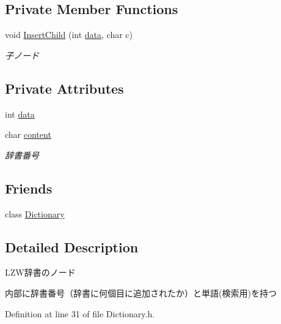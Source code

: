 \subsection*{Private Member Functions}
\begin{DoxyCompactItemize}
\item 
void \hyperlink{classprdc__lzw_1_1LzwNode_adcb9f453effcb8fac95bb08a59665eb7}{Insert\-Child} (int \hyperlink{classprdc__lzw_1_1LzwNode_ac85178681ea1181b22c3ac43af32515a}{data}, char c)
\begin{DoxyCompactList}\small\item\em 子ノード \end{DoxyCompactList}\end{DoxyCompactItemize}
\subsection*{Private Attributes}
\begin{DoxyCompactItemize}
\item 
int \hyperlink{classprdc__lzw_1_1LzwNode_ac85178681ea1181b22c3ac43af32515a}{data}
\item 
char \hyperlink{classprdc__lzw_1_1LzwNode_acb2b7cb34053125cfdf7595aba9bc172}{content}
\begin{DoxyCompactList}\small\item\em 辞書番号 \end{DoxyCompactList}\end{DoxyCompactItemize}
\subsection*{Friends}
\begin{DoxyCompactItemize}
\item 
class \hyperlink{classprdc__lzw_1_1LzwNode_a61780a02d5e0994eb40a4b79f9c007ad}{Dictionary}
\end{DoxyCompactItemize}


\subsection{Detailed Description}
L\-Z\-W辞書のノード 

内部に辞書番号（辞書に何個目に追加されたか）と単語(検索用)を持つ 

Definition at line 31 of file Dictionary.\-h.



